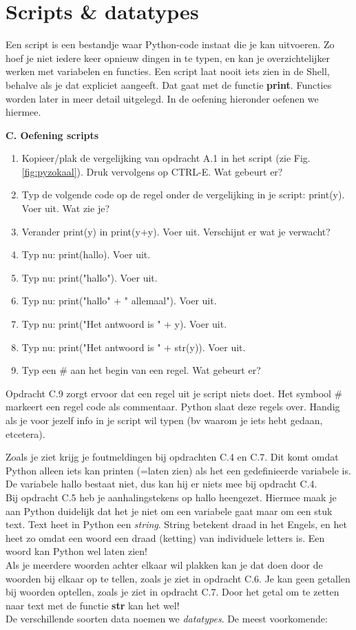 \section{Scripts \& datatypes}
Een script is een bestandje waar Python-code instaat die je kan uitvoeren. Zo hoef je niet iedere keer opnieuw dingen in te typen, en kan je overzichtelijker werken met variabelen en functies. Een script laat nooit iets zien in de Shell, behalve als je dat expliciet aangeeft. Dat gaat met de functie \textbf{print}. Functies worden later in meer detail uitgelegd. In de oefening hieronder oefenen we hiermee.

\textbf{C. Oefening scripts}
\begin{enumerate}[label=\textbf{C.\arabic*}]
\item Kopieer/plak de vergelijking van opdracht A.1 in het script (zie Fig.\ref{fig:pyzokaal}). Druk vervolgens op CTRL-E. Wat gebeurt er?
\item Typ de volgende code op de regel onder de vergelijking in je script: print(y). Voer uit. Wat zie je?
\item Verander print(y) in print(y+y). Voer uit. Verschijnt er wat je verwacht?
\item Typ nu: print(hallo). Voer uit.
\item Typ nu: print("hallo"). Voer uit.
\item Typ nu: print("hallo" + " allemaal"). Voer uit.
\item Typ nu: print("Het antwoord is " + y). Voer uit.
\item Typ nu: print("Het antwoord is " + str(y)). Voer uit.
\item Typ een \# aan het begin van een regel. Wat gebeurt er?
\end{enumerate}

Opdracht C.9 zorgt ervoor dat een regel uit je script niets doet. Het symbool \# markeert een regel code als commentaar. Python slaat deze regels over. Handig als je voor jezelf info in je script wil typen (bv waarom je iets hebt gedaan, etcetera). 

Zoals je ziet krijg je foutmeldingen bij opdrachten C.4 en C.7. Dit komt omdat Python alleen iets kan printen (=laten zien) als het een gedefinieerde variabele is. De variabele hallo bestaat niet, dus kan hij er niets mee bij opdracht C.4. \\
Bij opdracht C.5 heb je aanhalingstekens op hallo heengezet. Hiermee maak je aan Python duidelijk dat het je niet om een variabele gaat maar om een stuk text. Text heet in Python een \textit{string}. String betekent draad in het Engels, en het heet zo omdat een woord een draad (ketting) van individuele letters is. Een woord kan Python wel laten zien! \\
Als je meerdere woorden achter elkaar wil plakken kan je dat doen door de woorden bij elkaar op te tellen, zoals je ziet in opdracht C.6. Je kan geen getallen bij woorden optellen, zoals je ziet in opdracht C.7. Door het getal om te zetten naar text met de functie \textbf{str} kan het wel! \\
De verschillende soorten data noemen we \textit{datatypes}. De meest voorkomende: 

